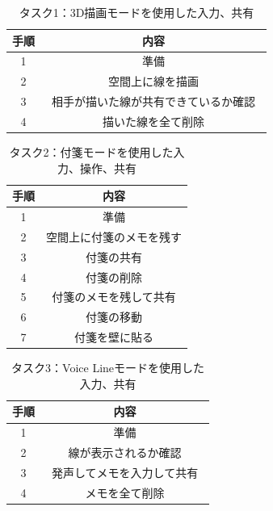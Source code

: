\documentclass[11pt,a4j, titlepage]{jarticle} %
\begin{document}
\begin{table}[H]
\caption{タスク1：3D描画モードを使用した入力、共有}
\label{table:task1}
\begin{center}
\begin{tabular}{|c|c|}
\hline
手順 & 内容  \\
\hline\hline
1 & 準備  \\
\hline
2 & 空間上に線を描画  \\
\hline
3 & 相手が描いた線が共有できているか確認　\\
\hline
4 & 描いた線を全て削除  \\
\hline
\end{tabular}
\end{center}
\end{table}

\begin{table}[H]
\caption{タスク2：付箋モードを使用した入力、操作、共有}
\label{table:task2}
\begin{center}
\begin{tabular}{|c|c|}
\hline
手順 & 内容  \\
\hline\hline
1 & 準備  \\
\hline
2 & 空間上に付箋のメモを残す  \\
\hline
3 & 付箋の共有　\\
\hline
4 & 付箋の削除  \\
\hline
5 & 付箋のメモを残して共有  \\
\hline
6 & 付箋の移動　\\
\hline
7 & 付箋を壁に貼る \\
\hline
\end{tabular}
\end{center}
\end{table}

\begin{table}[H]
\caption{タスク3：Voice Lineモードを使用した入力、共有}
\label{table:task3}
\begin{center}
\begin{tabular}{|c|c|}
\hline
手順 & 内容  \\
\hline\hline
1 & 準備  \\
\hline
2 & 線が表示されるか確認  \\
\hline
3 & 発声してメモを入力して共有　\\
\hline
4 & メモを全て削除  \\
\hline
\end{tabular}
\end{center}
\end{table}
\end{document}
